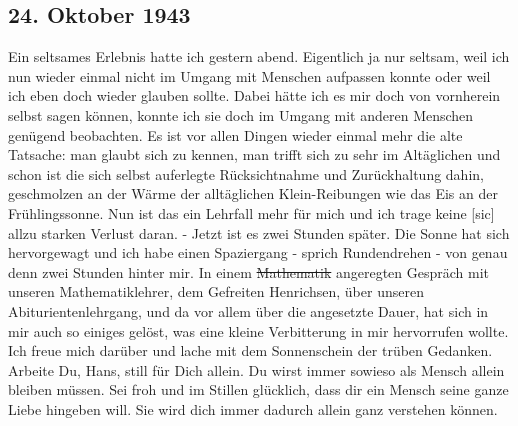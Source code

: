 \subsection{24. Oktober 1943}

Ein seltsames Erlebnis hatte ich gestern abend.
Eigentlich ja nur seltsam, weil ich nun wieder einmal nicht im Umgang mit Menschen aufpassen konnte oder weil ich eben doch wieder glauben sollte.
Dabei h\"{a}tte ich es mir doch von vornherein selbst sagen k\"{o}nnen, konnte ich sie doch im Umgang mit anderen Menschen gen\"{u}gend beobachten.
Es ist vor allen Dingen wieder einmal mehr die alte Tatsache: man glaubt sich zu kennen, man trifft sich zu sehr im Alt\"{a}glichen und schon ist die sich selbst auferlegte R\"{u}cksichtnahme und Zur\"{u}ckhaltung dahin, geschmolzen an der W\"{a}rme der allt\"{a}glichen Klein-Reibungen wie das Eis an der  Fr\"{u}hlingssonne.
Nun ist das ein Lehrfall mehr f\"{u}r mich und ich trage keine{\color{red} [sic] } allzu starken Verlust daran.
- Jetzt ist es zwei Stunden sp\"{a}ter.
Die Sonne hat sich hervorgewagt und ich habe einen Spaziergang - sprich Rundendrehen - von genau denn zwei Stunden hinter mir.
In einem \st{Mathematik} angeregten Gespr\"{a}ch mit unseren Mathematiklehrer, dem Gefreiten Henrichsen, \"{u}ber unseren Abiturientenlehrgang, und da vor allem \"{u}ber die angesetzte Dauer, hat sich in mir auch so einiges gel\"{o}st, was eine kleine Verbitterung in mir hervorrufen wollte.
Ich freue mich dar\"{u}ber und lache mit dem Sonnenschein der tr\"{u}ben Gedanken.
Arbeite Du, Hans, still f\"{u}r Dich allein.
Du wirst immer sowieso als Mensch allein bleiben m\"{u}ssen.
Sei froh und im Stillen gl\"{u}cklich, dass dir ein Mensch seine ganze Liebe hingeben will.
Sie wird dich immer dadurch allein ganz verstehen k\"{o}nnen.

\clearpage
